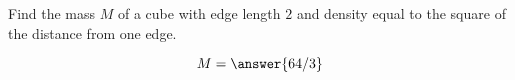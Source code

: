 \documentclass{ximera}
\author{David Guichard \and Neal Koblitz \and H. Jerome Keisler \and Albert Scheller \and Barry Balof \and Mike Wills \and Matthew Carr}
\begin{document}
\begin{exercise}





Find the mass $M$ of a cube with edge length $2$ and density equal to the square of the distance from one edge.
\begin{prompt}
\[
M=\answer{64/3}
\]
\end{prompt}



\end{exercise}
\end{document}
